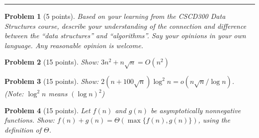 \documentclass[11pt]{article}
\newtheorem{problem}{Problem}
\begin{document}
\renewcommand{\headrulewidth}{0.4pt}



\noindent
\rule[0.1cm]{16.5cm}{0.01cm} 





\vspace*{2mm}

\newpage

\begin{problem}[5 points]
\label{prob:1}
  Based on your learning from the CSCD300 Data Structures course,
  describe your understanding of the connection and difference between
  the ``data structures'' and ``algorithms''.  Say your opinions in
  your own language. Any reasonable opinion is welcome.
\end{problem}



\begin{problem}[15 points]
\label{prob:2}
  Show: $3n^2+n\sqrt{n}=O(n^2)$
\end{problem}




\begin{problem}[15 points]
\label{prob:3}
Show: $2(n+100\sqrt{n})\log^2 n = o(n\sqrt{n}/\log n)$. 
{\em (Note: $\log^2 n$ means $(\log n)^2$)}
\end{problem}




\begin{problem}[15 points]
\label{prob:4}
  Let $f(n)$ and $g(n)$ be asymptotically nonnegative functions.  Show:
  $f(n)+g(n) = \Theta(\max\{f(n), g(n)\})$, using the definition of
  $\Theta$.
\end{problem}



\end{document}
